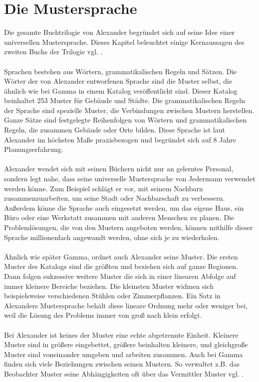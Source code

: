 \documentclass[fontsize=11pt,a4paper,final]{scrreprt}[2003/01/01]
\begin{document}
\section{Die Mustersprache}
Die gesamte Buchtrilogie von Alexander begründet sich auf seine Idee einer universellen Mustersprache. Dieses Kapitel beleuchtet einige Kernaussagen des zweiten Buchs der Trilogie vgl. \cite[S. IX - XLIV]{Alexander1977}. \\ \\
Sprachen bestehen aus Wörtern, grammatikalischen Regeln und Sätzen. Die Wörter der von Alexander entworfenen Sprache sind die Muster selbst, die ähnlich wie bei Gamma in einem Katalog veröffentlicht sind. Dieser Katalog beinhaltet 253 Muster für Gebäude und Städte. Die grammatikalischen Regeln der Sprache sind spezielle Muster, die Verbindungen zwischen Mustern herstellen. Ganze Sätze sind festgelegte Reihenfolgen von Wörtern und grammatikalischen Regeln, die zusammen Gebäude oder Orte bilden. Diese Sprache ist laut Alexander im höchsten Maße praxisbezogen und begründet sich auf 8 Jahre Planungserfahrung. \\ \\
Alexander wendet sich mit seinen Büchern nicht nur an gelerntes Personal, sondern legt  nahe, dass seine universelle Mustersprache von Jedermann verwendet werden könne. Zum Beispiel schlägt er vor, mit seinem Nachbarn zusammenzuarbeiten, um seine Stadt oder Nachbarschaft zu verbessern. Außerdem könne die Sprache auch eingesetzt werden, um das eigene Haus, ein Büro oder eine Werkstatt zusammen mit anderen Menschen zu planen. Die Problemlösungen, die von den Mustern angeboten werden, können mithilfe dieser Sprache millionenfach angewandt werden, ohne sich je zu wiederholen. \\ \\
Ähnlich wie später Gamma, ordnet auch Alexander seine Muster. Die ersten Muster des Katalogs sind die größten und beziehen sich auf ganze Regionen. Dann folgen sukzessive weitere Muster die sich in einer linearen Abfolge auf immer kleinere Bereiche beziehen. Die kleinsten Muster widmen sich beispielsweise verschiedenen Stühlen oder Zimmerpflanzen. Ein Satz in Alexanders Mustersprache behält diese lineare Ordnung mehr oder weniger bei, weil die Lösung des Problems immer von groß nach klein erfolgt. \\ \\
Bei Alexander ist keines der Muster eine echte abgetrennte Einheit. Kleinere Muster sind in größere eingebettet, größere beinhalten kleinere, und gleichgroße Muster sind voneinander umgeben und arbeiten zusammen. Auch bei Gamma finden sich viele Beziehungen zwischen seinen Mustern. So verwaltet z.B. das Beobachter Muster seine Abhängigkeiten oft über das Vermittler Muster vgl. \cite[S. 16]{gamma2004}. \\ \\
\end{document}
